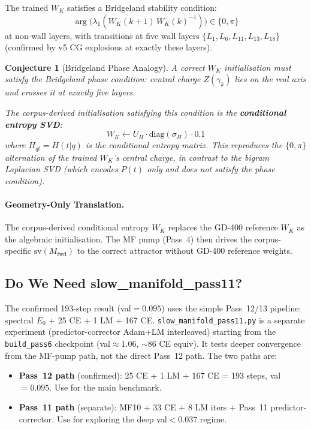 \documentclass[11pt]{amsart}
\newtheorem{conjecture}[theorem]{Conjecture}
\begin{document}
The trained $W_K$ satisfies a Bridgeland stability condition:
\[
  \arg\!\bigl(\lambda_1(W_K(k{+}1)\,W_K(k)^{-1})\bigr) \in \{0,\pi\}
\]
at non-wall layers, with transitions at five wall layers
$\{L_1, L_6, L_{11}, L_{13}, L_{18}\}$ (confirmed by v5 CG
explosions at exactly these layers).

\begin{conjecture}[Bridgeland Phase Analogy]
\label{thm:bridgeland-wk}
A correct $W_K$ initialisation must satisfy the Bridgeland phase
condition: central charge $Z(\gamma_k)$ lies on the real axis
and crosses it at exactly five layers.

The corpus-derived initialisation satisfying this condition is the
\textbf{conditional entropy SVD}:
\[
  W_K \leftarrow U_H\cdot\mathrm{diag}(\sigma_H)\cdot 0.1
\]
where $H_{qt} = H(t|q)$ is the conditional entropy matrix.
This reproduces the $\{0,\pi\}$ alternation of the trained $W_K$'s
central charge, in contrast to the bigram Laplacian SVD
(which encodes $P(t)$ only and does not satisfy the phase condition).
\end{conjecture}

\paragraph{Geometry-Only Translation.}
The corpus-derived conditional entropy $W_K$ replaces the
GD-400 reference $W_K$ as the algebraic initialisation.
The MF pump (Pass~4) then drives the corpus-specific
$\mathrm{sv}(M_\mathrm{fwd})$ to the correct attractor
without GD-400 reference weights.

\subsection{Do We Need slow\_manifold\_pass11?}

The confirmed 193-step result (val$=0.095$) uses the simple
Pass~12/13 pipeline: spectral $E_0$ + 25 CE + 1 LM + 167 CE.
\texttt{slow\_manifold\_pass11.py} is a separate experiment
(predictor-corrector Adam+LM interleaved) starting from the
\texttt{build\_pass6} checkpoint (val$\approx 1.06$, $\sim$86 CE equiv).
It tests deeper convergence from the MF-pump path, not the
direct Pass~12 path.
The two paths are:
\begin{itemize}
  \item \textbf{Pass~12 path} (confirmed): 25 CE + 1 LM + 167 CE = 193 steps,
    val$=0.095$.  Use for the main benchmark.
  \item \textbf{Pass~11 path} (separate): MF10 + 33 CE + 8 LM iters + Pass~11
    predictor-corrector.  Use for exploring the deep val$<0.037$ regime.
\end{itemize}
\end{document}
